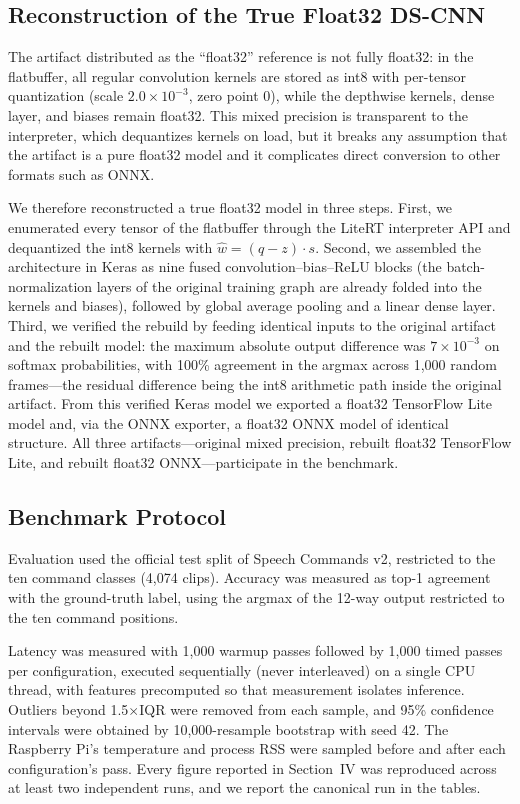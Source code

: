 \documentclass[conference,a4paper]{IEEEtran}
\begin{document}
\subsection{Reconstruction of the True Float32 DS-CNN}

The artifact distributed as the ``float32'' reference is not fully float32: in the flatbuffer, all regular convolution kernels are stored as int8 with per-tensor quantization (scale $2.0\times10^{-3}$, zero point 0), while the depthwise kernels, dense layer, and biases remain float32. This mixed precision is transparent to the interpreter, which dequantizes kernels on load, but it breaks any assumption that the artifact is a pure float32 model and it complicates direct conversion to other formats such as ONNX.

We therefore reconstructed a true float32 model in three steps. First, we enumerated every tensor of the flatbuffer through the LiteRT interpreter API and dequantized the int8 kernels with $\hat{w} = (q - z) \cdot s$. Second, we assembled the architecture in Keras as nine fused convolution--bias--ReLU blocks (the batch-normalization layers of the original training graph are already folded into the kernels and biases), followed by global average pooling and a linear dense layer. Third, we verified the rebuild by feeding identical inputs to the original artifact and the rebuilt model: the maximum absolute output difference was $7\times10^{-3}$ on softmax probabilities, with 100\% agreement in the argmax across 1{,}000 random frames---the residual difference being the int8 arithmetic path inside the original artifact. From this verified Keras model we exported a float32 TensorFlow Lite model and, via the ONNX exporter, a float32 ONNX model of identical structure. All three artifacts---original mixed precision, rebuilt float32 TensorFlow Lite, and rebuilt float32 ONNX---participate in the benchmark.

\subsection{Benchmark Protocol}

Evaluation used the official test split of Speech Commands v2, restricted to the ten command classes (4{,}074 clips). Accuracy was measured as top-1 agreement with the ground-truth label, using the argmax of the 12-way output restricted to the ten command positions.

Latency was measured with 1{,}000 warmup passes followed by 1{,}000 timed passes per configuration, executed sequentially (never interleaved) on a single CPU thread, with features precomputed so that measurement isolates inference. Outliers beyond 1.5$\times$IQR were removed from each sample, and 95\% confidence intervals were obtained by 10{,}000-resample bootstrap with seed 42. The Raspberry Pi's temperature and process RSS were sampled before and after each configuration's pass. Every figure reported in Section~IV was reproduced across at least two independent runs, and we report the canonical run in the tables.
\end{document}
